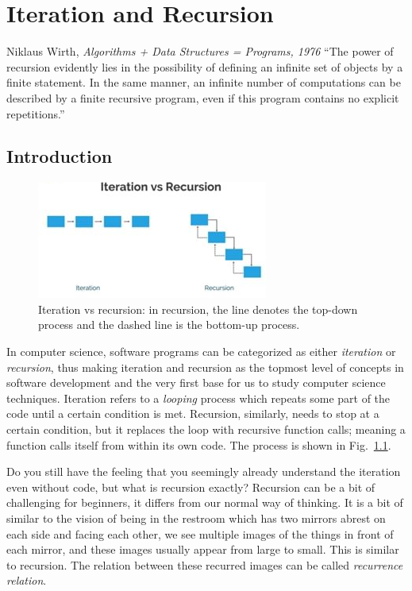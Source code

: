 \documentclass[../main.tex]{subfiles}
\begin{document}
\chapter{Iteration and Recursion}
\label{chapter_iteration_recursion}
\begin{chapquote}
{Niklaus Wirth, \textit{Algorithms + Data Structures = Programs, 1976}}
``The power of recursion evidently lies in the possibility of defining an infinite set of objects by a finite statement. In the same manner, an infinite number of computations can be described by a finite recursive program, even if this program contains no explicit repetitions.''
\end{chapquote}

\section{Introduction}
\label{iteration_recursion_introduction}
\begin{figure}[h]
    \centering
    \includegraphics[width = 0.7\columnwidth]{fig/iteration_recursion.png}
    \caption{Iteration vs recursion: in recursion, the line denotes the top-down process and the dashed line is the bottom-up process. }
    \label{fig:iteration_vs_recursion}
\end{figure}
In computer science, software programs can be categorized as either \textit{iteration} or \textit{recursion}, thus making iteration and recursion as the topmost level of concepts in software development and the very first base for us to study computer science techniques. Iteration refers to a \textit{looping} process which repeats some part of the code until a certain condition is met. Recursion, similarly, needs to stop at a certain condition, but it replaces the loop with recursive function calls; meaning  a function calls itself from within its own code. The process is shown in Fig.~\ref{fig:iteration_vs_recursion}. 

Do you still have the feeling that you seemingly already understand the iteration even without code, but what is recursion exactly? Recursion can be a bit of challenging for beginners, it differs from our normal way of thinking. It is a bit of similar to the vision of being in the restroom which has two mirrors abrest on each side and facing each other, we see multiple images of the things in front of each mirror, and these images usually appear from large to small. This is similar to recursion. The relation between these recurred images can be called \textit{recurrence relation}. 
\end{document}
